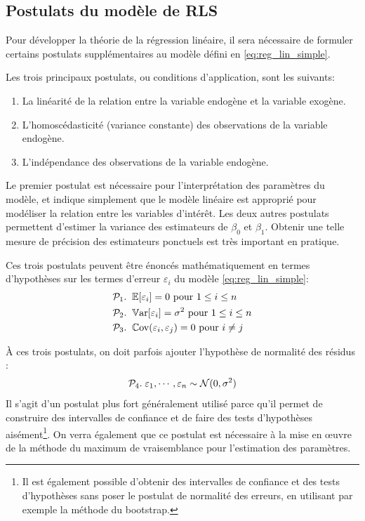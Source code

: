 \subsection{Postulats du modèle de RLS}
\label{sec:Postulats}

Pour développer la théorie de la régression linéaire, il sera nécessaire de formuler certains postulats supplémentaires au modèle défini en \ref{eq:reg_lin_simple}.

Les trois principaux postulats, ou conditions d'application, sont les suivants:
\begin{enumerate}
  \item[$\mathcal{P}_1$.] La linéarité de la relation entre la variable endogène et la variable exogène.
 \item[$\mathcal{P}_2$.] L'homoscédasticité (variance constante) des observations de la variable endogène.
 \item[$\mathcal{P}_3$.] L'indépendance des observations de la variable endogène.
\end{enumerate}

Le premier postulat est nécessaire pour l'interprétation des paramètres du modèle, et indique simplement que le modèle linéaire est approprié pour modéliser la relation entre les variables d'intérêt. Les deux autres postulats %
permettent d'estimer la variance des estimateurs de $\beta_0$ et $\beta_1$. Obtenir une telle mesure de précision des estimateurs ponctuels est très important en pratique.

Ces trois postulats peuvent être énoncés mathématiquement en termes d'hypothèses sur les termes d'erreur $\varepsilon_i$ du modèle \eqref{eq:reg_lin_simple}:
\begin{align*}
\mathcal{P}_1. & \; \; \mathbb{E}[\varepsilon_i]=0 \mbox{ pour } 1\leq i \leq n\\
\mathcal{P}_2. & \; \; \mathbb{V}\text{ar}[\varepsilon_i]=\sigma^2 \mbox{ pour } 1\leq i \leq n\\
\mathcal{P}_3. & \; \; \mathbb{C}\text{ov}(\varepsilon_i,\varepsilon_j)=0 \mbox{ pour } i \neq j
\end{align*}

À ces trois postulats, on doit parfois ajouter l'hypothèse de normalité des résidus :
$$ \mathcal{P}_4. \;\varepsilon_1, \cdots , \varepsilon_n \sim \mathcal{N}(0,\sigma^2)$$
Il s'agit d'un postulat plus fort généralement utilisé parce qu'il permet de construire des intervalles de confiance et de faire des tests d'hypothèses aisément\footnote{Il est également possible d'obtenir des intervalles de confiance et des tests d'hypothèses sans poser le postulat de normalité des erreurs, en utilisant par exemple la méthode du bootstrap.}. On verra également que ce postulat est nécessaire à la mise en {\oe}uvre de la méthode du maximum de vraisemblance pour l'estimation des paramètres.

